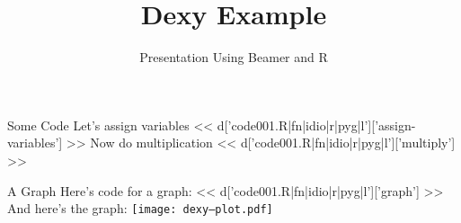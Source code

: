 \documentclass{beamer}
\title{Dexy Example}
\subtitle{Presentation Using Beamer and R}
\begin{document}
\begin{frame}
  \titlepage
\end{frame}

\begin{frame}[fragile]{Some Code}
Let's assign variables
<< d['code001.R|fn|idio|r|pyg|l']['assign-variables'] >>
Now do multiplication
<< d['code001.R|fn|idio|r|pyg|l']['multiply'] >>
\end{frame}

\begin{frame}[fragile]{A Graph}
Here's code for a graph:
<< d['code001.R|fn|idio|r|pyg|l']['graph'] >>
And here's the graph:
\texttt{[image: dexy--plot.pdf]}
\end{frame}
\end{document}
